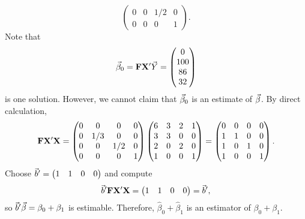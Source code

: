 \begin{Example}{}{}
\[\begin{pmatrix}
            0 & 0   & 1/2 & 0 \\
            0 & 0   & 0   & 1
        \end{pmatrix}. \]
    Note that
    \[ \vec{\beta}_0=\mathbf{F}\mathbf{X}'\vec{Y}=
        \begin{pmatrix}
            0 \\100\\86\\32
        \end{pmatrix} \]
    is one solution.
    However, we cannot claim that $ \vec{\beta}_0 $ is an estimate of $ \vec{\beta} $.
    By direct calculation,
    \[ \mathbf{F}\mathbf{X}'\mathbf{X}
        =\begin{pmatrix}
            0 & 0   & 0   & 0 \\
            0 & 1/3 & 0   & 0 \\
            0 & 0   & 1/2 & 0 \\
            0 & 0   & 0   & 1
        \end{pmatrix}\begin{pmatrix}
            6 & 3 & 2 & 1 \\
            3 & 3 & 0 & 0 \\
            2 & 0 & 2 & 0 \\
            1 & 0 & 0 & 1
        \end{pmatrix}=\begin{pmatrix}
            0 & 0 & 0 & 0 \\
            1 & 1 & 0 & 0 \\
            1 & 0 & 1 & 0 \\
            1 & 0 & 0 & 1
        \end{pmatrix}. \]
    Choose $ \vec{b}'=\begin{pmatrix}
            1 & 1 & 0 & 0
        \end{pmatrix} $ and compute
    \[ \vec{b}'\mathbf{F}\mathbf{X}'\mathbf{X}=\begin{pmatrix}
            1 & 1 & 0 & 0
        \end{pmatrix}=\vec{b}', \]
    so $ \vec{b}'\vec{\beta}=\beta_0+\beta_1 $ is estimable. Therefore, $ \hat{\beta}_0+\hat{\beta}_1 $ is an estimator of $ \beta_0+\beta_1 $.
\end{Example}
